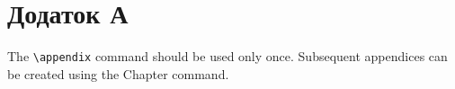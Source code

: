 \chapter{Додаток А}

The \verb"\appendix" command should be used only once. Subsequent
appendices can be created using the Chapter command.
